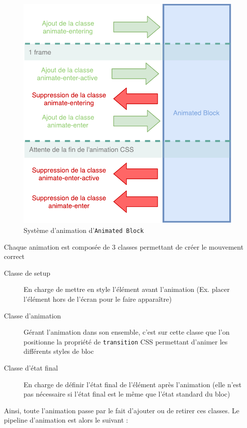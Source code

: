 \begin{figure}[h]
    \centering
    \includegraphics[scale=0.5]{img/animated-block.pdf}
    \caption{Système d'animation d'\texttt{Animated Block}}
\end{figure}

Chaque animation est composée de 3 classes permettant de créer le mouvement correct

\begin{description}
    \item[Classe de setup] En charge de mettre en style l'élément avant l'animation (Ex. placer l'élément hors de l'écran pour le faire apparaître)
    \item[Classe d'animation] Gérant l'animation dans son ensemble, c'est sur cette classe que l'on positionne la propriété de \texttt{transition} CSS permettant d'animer les différents styles de bloc
    \item[Classe d'état final] En charge de définir l'état final de l'élément après l'animation (elle n'est pas nécessaire si l'état final est le même que l'état standard du bloc)
\end{description}

Ainsi, toute l'animation passe par le fait d'ajouter ou de retirer ces classes.
Le pipeline d'animation est alors le suivant :

